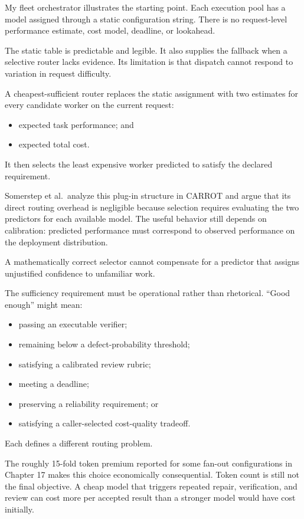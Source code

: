 My fleet orchestrator illustrates the starting point. Each execution pool has a model assigned through a static configuration string. There is no request-level performance estimate, cost model, deadline, or lookahead.

The static table is predictable and legible. It also supplies the fallback when a selective router lacks evidence. Its limitation is that dispatch cannot respond to variation in request difficulty.

A cheapest-sufficient router replaces the static assignment with two estimates for every candidate worker on the current request:

\begin{itemize}
\tightlist
\item
  expected task performance; and
\item
  expected total cost.
\end{itemize}

It then selects the least expensive worker predicted to satisfy the declared requirement.

Somerstep et al.~analyze this plug-in structure in CARROT and argue that its direct routing overhead is negligible because selection requires evaluating the two predictors for each available model. The useful behavior still depends on calibration: predicted performance must correspond to observed performance on the deployment distribution.

A mathematically correct selector cannot compensate for a predictor that assigns unjustified confidence to unfamiliar work.

The sufficiency requirement must be operational rather than rhetorical. ``Good enough'' might mean:

\begin{itemize}
\tightlist
\item
  passing an executable verifier;
\item
  remaining below a defect-probability threshold;
\item
  satisfying a calibrated review rubric;
\item
  meeting a deadline;
\item
  preserving a reliability requirement; or
\item
  satisfying a caller-selected cost-quality tradeoff.
\end{itemize}

Each defines a different routing problem.

The roughly 15-fold token premium reported for some fan-out configurations in Chapter 17 makes this choice economically consequential. Token count is still not the final objective. A cheap model that triggers repeated repair, verification, and review can cost more per accepted result than a stronger model would have cost initially.

